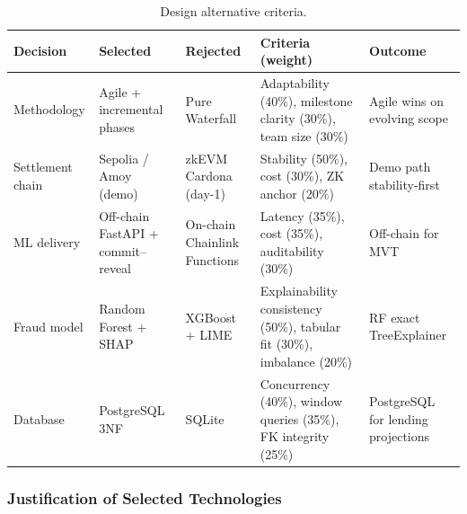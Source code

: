 \begin{table}[H]
\centering
\caption[Design alternative criteria]{Design alternative criteria.}
\label{tab:design-alternatives-criteria}
\footnotesize
\begin{tabular}{@{}p{2.6cm}p{2.2cm}p{2.2cm}p{2.8cm}p{3.4cm}@{}}
\toprule
\tableheadcolor
\textbf{Decision} & \textbf{Selected} & \textbf{Rejected} & \textbf{Criteria (weight)} & \textbf{Outcome} \\
\midrule
Methodology & Agile + incremental phases & Pure Waterfall & Adaptability (40\%), milestone clarity (30\%), team size (30\%) & Agile wins on evolving scope \\
Settlement chain & Sepolia / Amoy (demo) & zkEVM Cardona (day-1) & Stability (50\%), cost (30\%), ZK anchor (20\%) & Demo path stability-first \\
ML delivery & Off-chain FastAPI + commit--reveal & On-chain Chainlink Functions & Latency (35\%), cost (35\%), auditability (30\%) & Off-chain for MVT \\
Fraud model & Random Forest + SHAP & XGBoost + LIME & Explainability consistency (50\%), tabular fit (30\%), imbalance (20\%) & RF exact TreeExplainer \\
Database & PostgreSQL 3NF & SQLite & Concurrency (40\%), window queries (35\%), FK integrity (25\%) & PostgreSQL for lending projections \\
\bottomrule
\end{tabular}
\end{table}

\subsubsection{Justification of Selected Technologies}


